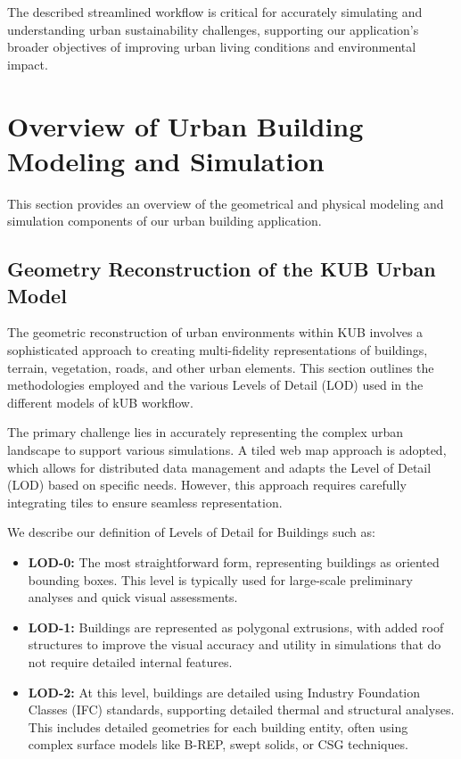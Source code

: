 \documentclass[runningheads]{llncs}
\begin{document}
The described streamlined workflow is critical for accurately simulating and understanding urban sustainability challenges, supporting our application's broader objectives of improving urban living conditions and environmental impact.


\section{Overview of Urban Building Modeling and Simulation}
\label{sec:urban-building}

This section provides an overview of the geometrical and physical modeling and simulation components of our urban building application.

\subsection{Geometry Reconstruction of the KUB Urban Model}

The geometric reconstruction of urban environments within KUB involves a sophisticated approach to creating multi-fidelity representations of buildings, terrain, vegetation, roads, and other urban elements. This section outlines the methodologies employed and the various Levels of Detail (LOD) used in the different models of kUB workflow.


The primary challenge lies in accurately representing the complex urban landscape to support various simulations. A tiled web map approach is adopted, which allows for distributed data management and adapts the Level of Detail (LOD) based on specific needs. However, this approach requires carefully integrating tiles to ensure seamless representation.


We describe our definition of Levels of Detail for Buildings such as:
\begin{itemize}
    \item \textbf{LOD-0:} The most straightforward form, representing buildings as oriented bounding boxes. This level is typically used for large-scale preliminary analyses and quick visual assessments.
    \item \textbf{LOD-1:} Buildings are represented as polygonal extrusions, with added roof structures to improve the visual accuracy and utility in simulations that do not require detailed internal features.
    \item \textbf{LOD-2:} At this level, buildings are detailed using Industry Foundation Classes (IFC) standards, supporting detailed thermal and structural analyses. This includes detailed geometries for each building entity, often using complex surface models like B-REP, swept solids, or CSG techniques.
\end{itemize}
\end{document}
